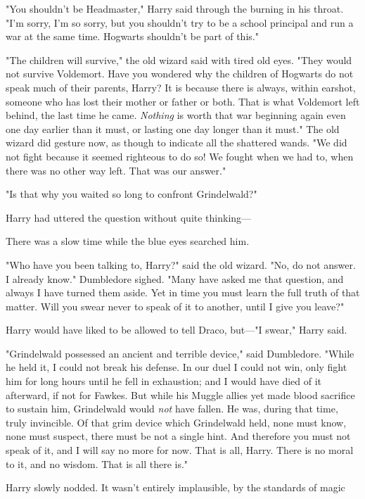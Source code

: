 "You shouldn't be Headmaster," Harry said through the burning in his throat.
"I'm sorry, I'm so sorry, but you shouldn't try to be a school principal and
run a war at the same time. Hogwarts shouldn't be part of this."

"The children will survive," the old wizard said with tired old eyes. "They
would not survive Voldemort. Have you wondered why the children of Hogwarts do
not speak much of their parents, Harry? It is because there is always, within
earshot, someone who has lost their mother or father or both. That is what
Voldemort left behind, the last time he came. \emph{Nothing} is worth that war
beginning again even one day earlier than it must, or lasting one day longer
than it must." The old wizard did gesture now, as though to indicate all the
shattered wands. "We did not fight because it seemed righteous to do so! We
fought when we had to, when there was no other way left. That was our answer."

"Is that why you waited so long to confront Grindelwald?"

Harry had uttered the question without quite thinking—

There was a slow time while the blue eyes searched him.

"Who have you been talking to, Harry?" said the old wizard. "No, do not answer.
I already know." Dumbledore sighed. "Many have asked me that question, and
always I have turned them aside. Yet in time you must learn the full truth of
that matter. Will you swear never to speak of it to another, until I give you
leave?"

Harry would have liked to be allowed to tell Draco, but—"I swear," Harry said.

"Grindelwald possessed an ancient and terrible device," said Dumbledore. "While
he held it, I could not break his defense. In our duel I could not win, only
fight him for long hours until he fell in exhaustion; and I would have died of
it afterward, if not for Fawkes. But while his Muggle allies yet made blood
sacrifice to sustain him, Grindelwald would \emph{not} have fallen. He was,
during that time, truly invincible. Of that grim device which Grindelwald held,
none must know, none must suspect, there must be not a single hint. And
therefore you must not speak of it, and I will say no more for now. That is
all, Harry. There is no moral to it, and no wisdom. That is all there is."

Harry slowly nodded. It wasn't entirely implausible, by the standards of
magic{\el}

